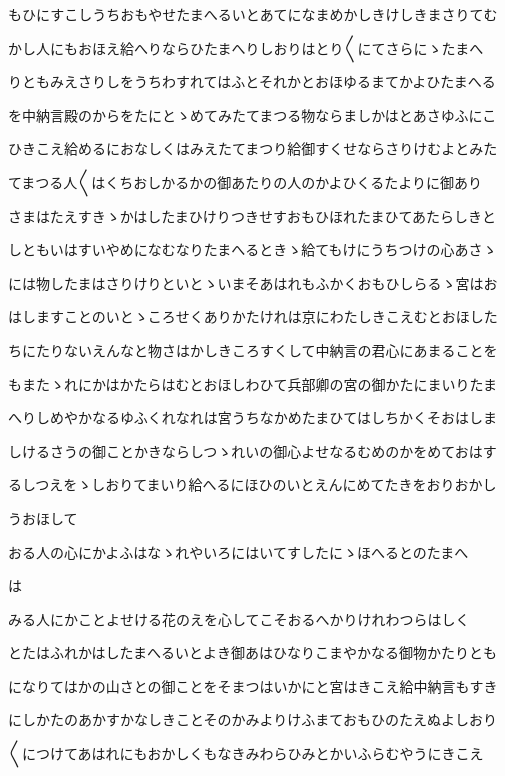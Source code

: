 \documentclass[a4paper,11pt,landscape]{ltjtarticle}
\begin{document}
もひにすこしうちおもやせたまへるいとあてになまめかしきけしきまさりてむ
\par\medskip
かし人にもおほえ給へりならひたまへりしおりはとり〱にてさらにゝたまへ
\par\medskip
りともみえさりしをうちわすれてはふとそれかとおほゆるまてかよひたまへる
\par\medskip
を中納言殿のからをたにとゝめてみたてまつる物ならましかはとあさゆふにこ
\par\medskip
ひきこえ給めるにおなしくはみえたてまつり給御すくせならさりけむよとみた
\par\medskip
てまつる人〱はくちおしかるかの御あたりの人のかよひくるたよりに御あり
\par\medskip
さまはたえすきゝかはしたまひけりつきせすおもひほれたまひてあたらしきと
\par\medskip
しともいはすいやめになむなりたまへるときゝ給てもけにうちつけの心あさゝ
\par\medskip
には物したまはさりけりといとゝいまそあはれもふかくおもひしらるゝ宮はお
\par\medskip
はしますことのいとゝころせくありかたけれは京にわたしきこえむとおほした
\par\medskip
ちにたりないえんなと物さはかしきころすくして中納言の君心にあまることを
\par\medskip
もまたゝれにかはかたらはむとおほしわひて兵部卿の宮の御かたにまいりたま
\par\medskip
へりしめやかなるゆふくれなれは宮うちなかめたまひてはしちかくそおはしま
\par\medskip
しけるさうの御ことかきならしつゝれいの御心よせなるむめのかをめておはす
\par\medskip
るしつえをゝしおりてまいり給へるにほひのいとえんにめてたきをおりおかし
\par\medskip
うおほして
\par\medskip
おる人の心にかよふはなゝれやいろにはいてすしたにゝほへるとのたまへ
\par\medskip
は
\par\medskip
みる人にかことよせける花のえを心してこそおるへかりけれわつらはしく
\par\medskip
とたはふれかはしたまへるいとよき御あはひなりこまやかなる御物かたりとも
\par\medskip
になりてはかの山さとの御ことをそまつはいかにと宮はきこえ給中納言もすき
\par\medskip
にしかたのあかすかなしきことそのかみよりけふまておもひのたえぬよしおり
\par\medskip
〱につけてあはれにもおかしくもなきみわらひみとかいふらむやうにきこえ
\end{document}
